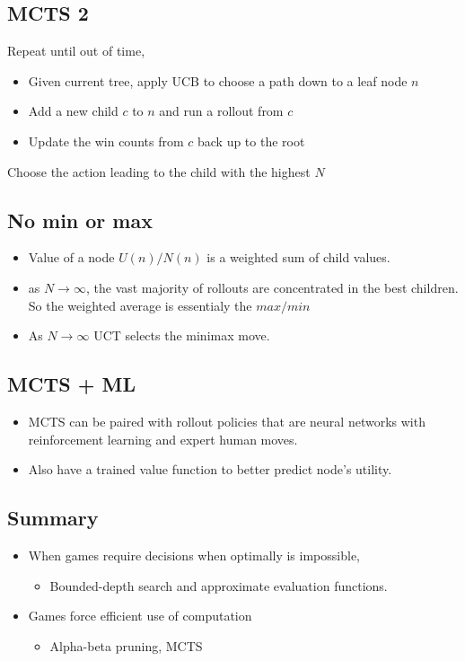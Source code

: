 \subsection{MCTS 2}
Repeat until out of time,
\begin{itemize}
    \item Given current tree, apply UCB to choose a path down to a leaf node $n$
    \item Add a new child $c$ to $n$ and run a rollout from $c$
    \item Update the win counts from  $c$ back up to the root 
\end{itemize}
Choose the action leading to the child with the highest $N$

\subsection{No min or max}
\begin{itemize}
    \item Value of a node $U(n) /N(n)$ is a weighted sum of child values.
    \item as  $N \rightarrow \infty$, the vast majority of rollouts are concentrated in the best children. So the weighted average is essentialy the  $max / min$ 
    \item As $N \rightarrow \infty$ UCT selects the minimax move.
\end{itemize}

\subsection{MCTS + ML}
\begin{itemize}
    \item MCTS can be paired with rollout policies that are neural networks with reinforcement learning and expert human moves.
    \item Also have a trained value function to better predict node's utility.
\end{itemize}



\subsection{Summary}
\begin{itemize}
    \item When games require decisions when optimally is impossible, 
        \begin{itemize}
            \item Bounded-depth search and approximate evaluation functions.
        \end{itemize}
    \item Games force efficient use of computation
        \begin{itemize}
            \item Alpha-beta pruning, MCTS
        \end{itemize}
\end{itemize}

